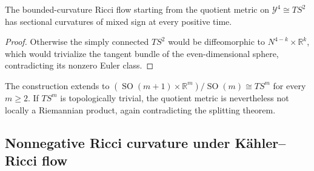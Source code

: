 \begin{corollary}
\label{cor:chow-ii-sectionally-nonnegative-quotient-counterexample}

The bounded-curvature Ricci flow starting from the quotient metric on
\(\mathcal Y^4\cong TS^2\) has sectional curvatures of mixed sign at every
positive time.
\end{corollary}
\begin{proof}
\sketch
{}
Otherwise the simply connected \(TS^2\) would be diffeomorphic to
\(N^{4-k}\times\mathbb R^k\), which would trivialize the tangent bundle of
the even-dimensional sphere, contradicting its nonzero Euler class.
\end{proof}

\begin{remark}
\label{rem:chow-ii-higher-tangent-bundle-counterexamples}


The construction extends to
\((\operatorname{SO}(m+1)\times\mathbb R^m)/\operatorname{SO}(m)\cong TS^m\)
for every \(m\geq2\).  If \(TS^m\) is topologically trivial, the quotient
metric is nevertheless not locally a Riemannian product, again contradicting
the splitting theorem.
\end{remark}

\subsection{Nonnegative Ricci curvature under Kähler--Ricci flow}

